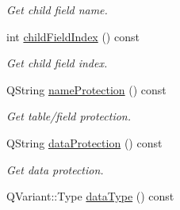 \begin{DoxyCompactItemize}
\begin{DoxyCompactList}\small\item\em Get child field name. \end{DoxyCompactList}\item 
\hypertarget{classmdt_sql_relation_item_a89f5e403c31df53c56ddfc4448d8b91d}{
int \hyperlink{classmdt_sql_relation_item_a89f5e403c31df53c56ddfc4448d8b91d}{childFieldIndex} () const }
\label{classmdt_sql_relation_item_a89f5e403c31df53c56ddfc4448d8b91d}

\begin{DoxyCompactList}\small\item\em Get child field index. \end{DoxyCompactList}\item 
QString \hyperlink{classmdt_sql_relation_item_a2aa445cebd77d6ce707b318f25cc709c}{nameProtection} () const 
\begin{DoxyCompactList}\small\item\em Get table/field protection. \end{DoxyCompactList}\item 
QString \hyperlink{classmdt_sql_relation_item_a46f16fdee2f8fba86ed82e7f7194751b}{dataProtection} () const 
\begin{DoxyCompactList}\small\item\em Get data protection. \end{DoxyCompactList}\item 
\hypertarget{classmdt_sql_relation_item_a8df1470c61b71ade740266b528f7b9a3}{
QVariant::Type \hyperlink{classmdt_sql_relation_item_a8df1470c61b71ade740266b528f7b9a3}{dataType} () const }
\label{classmdt_sql_relation_item_a8df1470c61b71ade740266b528f7b9a3}


\end{DoxyCompactItemize}
